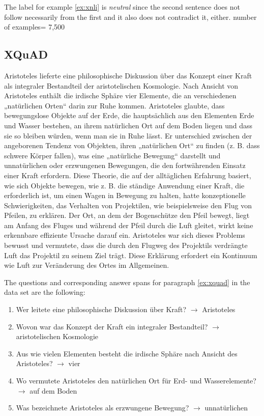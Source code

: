 The label for example \ref{ex:xnli} is \textit{neutral} since the second sentence does not follow necessarily from the first and it also does not contradict it, either.
number of examples= 7,500

\subsection{XQuAD}

\begin{examples}
	\label{ex:xquad}
	\item Aristoteles lieferte eine philosophische Diskussion über das Konzept einer Kraft als integraler Bestandteil der aristotelischen Kosmologie. Nach Ansicht von Aristoteles enthält die irdische Sphäre vier Elemente, die an verschiedenen „natürlichen Orten“ darin zur Ruhe kommen. Aristoteles glaubte, dass bewegungslose Objekte auf der Erde, die hauptsächlich aus den Elementen Erde und Wasser bestehen, an ihrem natürlichen Ort auf dem Boden liegen und dass sie so bleiben würden, wenn man sie in Ruhe lässt. Er unterschied zwischen der angeborenen Tendenz von Objekten, ihren „natürlichen Ort“ zu finden (z. B. dass schwere Körper fallen), was eine „natürliche Bewegung“ darstellt und unnatürlichen oder erzwungenen Bewegungen, die den fortwährenden Einsatz einer Kraft erfordern. Diese Theorie, die auf der alltäglichen Erfahrung basiert, wie sich Objekte bewegen, wie z. B. die ständige Anwendung einer Kraft, die erforderlich ist, um einen Wagen in Bewegung zu halten, hatte konzeptionelle Schwierigkeiten, das Verhalten von Projektilen, wie beispielsweise den Flug von Pfeilen, zu erklären. Der Ort, an dem der Bogenschütze den Pfeil bewegt, liegt am Anfang des Fluges und während der Pfeil durch die Luft gleitet, wirkt keine erkennbare effiziente Ursache darauf ein. Aristoteles war sich dieses Problems bewusst und vermutete, dass die durch den Flugweg des Projektils verdrängte Luft das Projektil zu seinem Ziel trägt. Diese Erklärung erfordert ein Kontinuum wie Luft zur Veränderung des Ortes im Allgemeinen.
\end{examples}

The questions and corresponding answer spans for paragraph \ref{ex:xquad} in the data set are the following:

\begin{enumerate}
	\item Wer leitete eine philosophische Diskussion über Kraft? $\rightarrow$ Aristoteles
	\item Wovon war das Konzept der Kraft ein integraler Bestandteil? $\rightarrow$ aristotelischen Kosmologie
	\item Aus wie vielen Elementen besteht die irdische Sphäre nach Ansicht des Aristoteles? $\rightarrow$ vier
	\item Wo vermutete Aristoteles den natürlichen Ort für Erd- und Wasserelemente? $\rightarrow$ auf dem Boden
	\item Was bezeichnete Aristoteles als erzwungene Bewegung? $\rightarrow$ unnatürlichen
\end{enumerate}

